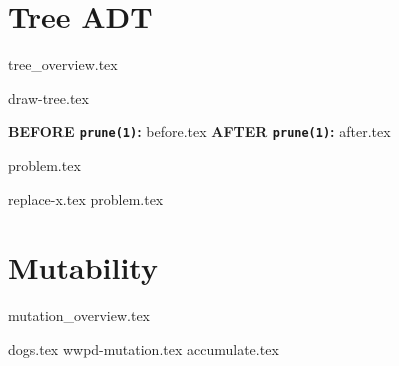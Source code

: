 \documentclass{exam}
\begin{document}
\section{Tree ADT}
{tree_overview.tex}
\newpage
\begin{questions}
    {draw-tree.tex}
    \newpage

    \begin{blocksection}
    \textbf{BEFORE \lstinline{prune(1)}:}
    {before.tex}
    \hspace{0.5in}
    \textbf{AFTER \lstinline{prune(1)}:}
    {after.tex}
    \end{blocksection}
    

    {problem.tex}

    {replace-x.tex}
    {problem.tex}
\end{questions}

\newpage
\section{Mutability}
{mutation_overview.tex}
	\begin{questions}
        {dogs.tex}
	    {wwpd-mutation.tex}
        {accumulate.tex}
	\end{questions}
\end{document}
